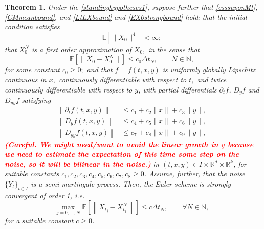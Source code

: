 \documentclass[reqno,12pt]{amsart}
\theoremstyle{plain} %
\newtheorem{theorem}{Theorem}[section]
\theoremstyle{definition} %
\newcommand{\comment}[1]{\textcolor{red}{\textbf{#1}}}
\begin{document}
\begin{theorem}
    \label{thmsemimartingale}
    Under the \cref{standinghypotheses1}, suppose further that \eqref{esssuponMt}, \eqref{CMmeanbound}, and \eqref{LtLXbound} and \eqref{EX0strongbound} hold; that the initial condition satisfies
    \begin{equation}
        \label{EX0strongboundfourth}
        \mathbb{E}[\|X_0\|^4] < \infty;
    \end{equation}
    that $X_0^N$ is a first order approximation of $X_0,$ in the sense that 
    \begin{equation}
        \label{EX0X0N}
        \mathbb{E}[\|X_0 - X_0^N\|] \leq c_0 \Delta t_N, \qquad N\in \mathbb{N},
    \end{equation}
    for some constant $c_0 \geq 0;$ and that $f=f(t, x, y)$ is uniformly globally Lipschitz continuous in $x,$ continuously differentiable with respect to $t,$ and twice continuously differentiable with respect to $y$, with partial differentials $\partial_t f$, $D_y f$ and $D_{yy} f$ satisfying 
    \begin{align}
        \label{ftfylineargrowthcadlagfvpartialt}
        \left\|\partial_t f(t, x, y)\right\| & \leq c_1 + c_2 \|x\| + c_3\|y\|, \\
        \label{ftfylineargrowthcadlagfvpartialv}
        \left\|D_y f(t, x, y)\right\| & \leq c_4 + c_5\|x\| + c_6\|y\|, \\
        \label{ftfylineargrowthsemimartingalepartialvv}
        \left\|D_{yy} f(t, x, y)\right\| & \leq c_7 + c_8\|x\| + c_9\|y\|,
    \end{align}
    \comment{(Careful. We might need/want to avoid the linear growth in $y$ because we need to estimate the expectation of this time some step on the noise, so it will be bilinear in the noise.)}
    in $(t, x, y)\in I\times \mathbb{R}^d\times \mathbb{R}^k$, for suitable constants $c_1, c_2, c_3, c_4, c_5, c_6, c_7, c_8 \geq 0$. Assume, further, that the noise $\{Y_t\}_{t\in I}$ is a semi-martingale process. Then, the Euler scheme is strongly convergent of order 1, i.e.
    \begin{equation}
        \label{ordersemimartingale}
        \max_{j=0, \ldots, N} \mathbb{E}\left[\left\| X_{t_j} - X_{t_j}^N \right\|\right] \leq c \Delta t_N, \qquad \forall N \in \mathbb{N},
    \end{equation}
    for a suitable constant $c\geq 0$.
\end{theorem}
\end{document}
